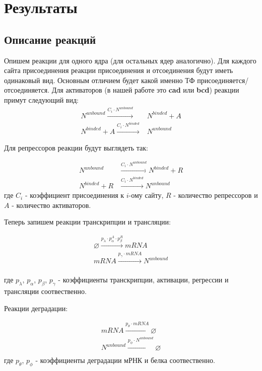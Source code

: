 \section{Результаты}
\subsection{Описание реакций}
Опишем реакции для одного ядра (для остальных ядер аналогично). Для каждого сайта присоединения реакции присоединения и отсоединения будут
иметь одинаковый вид. Основным отличием будет какой именно ТФ присоединяется/отсоединяется. Для активаторов (в нашей работе это \textbf{cad}
или \textbf{bcd}) реакции примут следующий вид:
\begin{align*}
N^{unbound}   \xrightarrow{C_i \cdot N^{unbound}} & N^{binded} + A\\
N^{binded} + A \xrightarrow{C_i \cdot N^{binded}}  & N^{unbound}
\end{align*}

Для репрессоров реакции будут выглядеть так:

\begin{align*}
N^{unbound}   & \xrightarrow{C_i \cdot N^{unbound}} N^{binded} + R\\
N^{binded} + R &  \xrightarrow{C_i \cdot N^{binded}}  N^{unbound}
\end{align*}
где $C_i$ - коэффициент присоединения к $i$-ому сайту, $R$ - количество репрессоров и $A$ - количество активаторов.

Теперь запишем реакции транскрипции и трансляции:

\begin{align*}
\varnothing \xrightarrow{p_{\lambda} \cdot p_{\alpha}^{A} \cdot p_{\beta}^{R}} mRNA \\
mRNA \xrightarrow{p_{\gamma} \cdot mRNA} N^{unbound} \\
\end{align*}

где $p_{\lambda}$, $p_{\alpha}$, $p_{\beta}$, $p_{\gamma}$ - коэффициенты транскрипции, активации, регрессии и трансляции соотвественно.

Реакции деградации:

\begin{align*}
mRNA \xrightarrow{p_{\theta} \cdot mRNA} \varnothing \\
N^{unbound} \xrightarrow{p_{\phi} \cdot N^{unbound}} \varnothing \\
\end{align*}
где $p_{\theta}$, $p_{\phi}$ - коэффициенты деградации мРНК и белка соотвественно.

